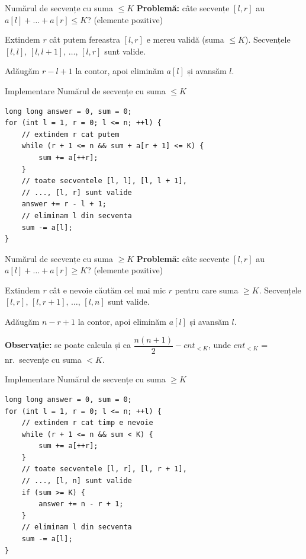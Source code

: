 ﻿\documentclass{beamer}
\begin{document}
\begin{frame}{Numărul de secvențe cu suma $\leq K$}
  \textbf{Problemă:} câte secvențe $[l, r]$ au $a[l] + \ldots + a[r] \leq K$? (elemente pozitive)

  \smallskip
  Extindem $r$ cât putem \textemdash{} fereastra $[l, r]$ e mereu validă (suma $\leq K$).
  Secvențele $[l, l],\, [l, l{+}1],\, \ldots,\, [l, r]$ sunt valide.

  \smallskip
  Adăugăm $r - l + 1$ la contor, apoi eliminăm $a[l]$ și avansăm $l$.
\end{frame}

\begin{frame}[fragile]{Implementare \textemdash{} Numărul de secvențe cu suma $\leq K$}
  \begin{lstlisting}
long long answer = 0, sum = 0;
for (int l = 1, r = 0; l <= n; ++l) {
    // extindem r cat putem
    while (r + 1 <= n && sum + a[r + 1] <= K) {
        sum += a[++r];
    }
    // toate secventele [l, l], [l, l + 1],
    // ..., [l, r] sunt valide
    answer += r - l + 1;
    // eliminam l din secventa
    sum -= a[l];
}
  \end{lstlisting}
\end{frame}

\begin{frame}{Numărul de secvențe cu suma $\geq K$}
  \textbf{Problemă:} câte secvențe $[l, r]$ au $a[l] + \ldots + a[r] \geq K$? (elemente pozitive)

  \smallskip
  Extindem $r$ cât e nevoie \textemdash{} căutăm cel mai mic $r$ pentru care suma $\geq K$.
  Secvențele $[l, r],\, [l, r{+}1],\, \ldots,\, [l, n]$ sunt valide.

  \smallskip
  Adăugăm $n - r + 1$ la contor, apoi eliminăm $a[l]$ și avansăm $l$.

  \smallskip
  \textbf{Observație:} se poate calcula și ca $\dfrac{n(n+1)}{2} - cnt_{< K}$, unde $cnt_{< K}$ = nr.\ secvențe cu suma $< K$.
\end{frame}

\begin{frame}[fragile]{Implementare \textemdash{} Numărul de secvențe cu suma $\geq K$}
  \begin{lstlisting}
long long answer = 0, sum = 0;
for (int l = 1, r = 0; l <= n; ++l) {
    // extindem r cat timp e nevoie
    while (r + 1 <= n && sum < K) {
        sum += a[++r];
    }
    // toate secventele [l, r], [l, r + 1],
    // ..., [l, n] sunt valide
    if (sum >= K) {
        answer += n - r + 1;
    }
    // eliminam l din secventa
    sum -= a[l];
}
  \end{lstlisting}
\end{frame}
\end{document}
